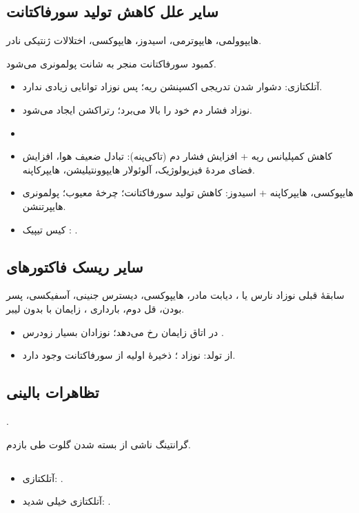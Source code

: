\documentclass[12pt,a4paper]{article}
\begin{document}
\subsection*{سایر علل کاهش تولید سورفاکتانت}
هایپوولمی، هایپوترمی، اسیدوز، هایپوکسی، اختلالات ژنتیکی نادر.
\par کمبود سورفاکتانت منجر به شانت پولمونری می‌شود.

\begin{itemize}
\item آتلکتازی: دشوار شدن تدریجی اکسپنشن ریه؛ پس نوزاد توانایی زیادی ندارد.
\item نوزاد فشار دم خود را بالا می‌برد؛ رتراکشن ایجاد می‌شود.
\item {}
\item کاهش کمپلیانس ریه + افزایش فشار دم (تاکی‌پنه): تبادل ضعیف هوا، افزایش فضای مردهٔ فیزیولوژیک، آلوئولار هایپوونتیلیشن، هایپرکاپنه.
\item هایپوکسی، هایپرکاپنه + اسیدوز: کاهش تولید سورفاکتانت؛ چرخهٔ معیوب؛ پولمونری هایپرتنشن.
\item کیس تیپیک : .
\end{itemize}
\subsection*{سایر ریسک فاکتورهای }
سابقهٔ قبلی نوزاد نارس یا ، دیابت مادر، هایپوکسی، دیسترس جنینی، آسفیکسی، پسر بودن، قل دوم، بارداری ، زایمان با  بدون لیبر.
\begin{itemize}
\item {}  در اتاق زایمان رخ می‌دهد؛ نوزادان بسیار زودرس .
\item {} از تولد: نوزاد ؛ ذخیرهٔ اولیه از سورفاکتانت وجود دارد.
\end{itemize}
\subsection*{تظاهرات بالینی }
.
\par گرانتینگ ناشی از بسته شدن گلوت طی بازدم.
\subsection*{}
\begin{itemize}
\item آتلکتازی: \lr{)}.
\item آتلکتازی خیلی شدید: \lr{)}.
\end{itemize}
\end{document}
